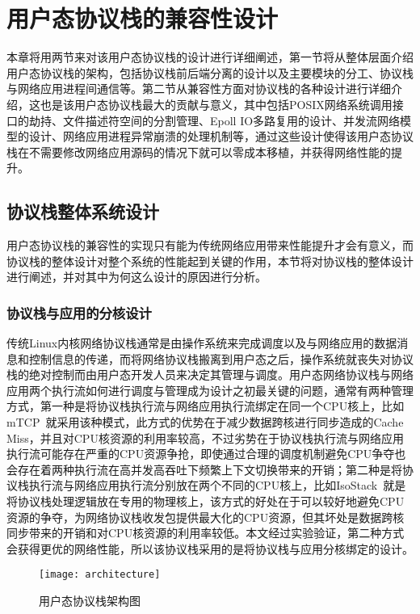 \chapter{用户态协议栈的兼容性设计}

本章将用两节来对该用户态协议栈的设计进行详细阐述，第一节将从整体层面介绍用户态协议栈的架构，包括协议栈前后端分离的设计以及主要模块的分工、协议栈与网络应用进程间通信等。第二节从兼容性方面对协议栈的各种设计进行详细介绍，这也是该用户态协议栈最大的贡献与意义，其中包括POSIX网络系统调用接口的劫持、文件描述符空间的分割管理、Epoll IO多路复用的设计、并发流网络模型的设计、网络应用进程异常崩溃的处理机制等，通过这些设计使得该用户态协议栈在不需要修改网络应用源码的情况下就可以零成本移植，并获得网络性能的提升。

\section{协议栈整体系统设计}

用户态协议栈的兼容性的实现只有能为传统网络应用带来性能提升才会有意义，而协议栈的整体设计对整个系统的性能起到关键的作用，本节将对协议栈的整体设计进行阐述，并对其中为何这么设计的原因进行分析。

\subsection{协议栈与应用的分核设计}

传统Linux内核网络协议栈通常是由操作系统来完成调度以及与网络应用的数据消息和控制信息的传递，而将网络协议栈搬离到用户态之后，操作系统就丧失对协议栈的绝对控制而由用户态开发人员来决定其管理与调度。用户态网络协议栈与网络应用两个执行流如何进行调度与管理成为设计之初最关键的问题，通常有两种管理方式，第一种是将协议栈执行流与网络应用执行流绑定在同一个CPU核上，比如mTCP~\cite{mTCP}就采用该种模式，此方式的优势在于减少数据跨核进行同步造成的Cache Miss，并且对CPU核资源的利用率较高，不过劣势在于协议栈执行流与网络应用执行流可能存在严重的CPU资源争抢，即使通过合理的调度机制避免CPU争夺也会存在着两种执行流在高并发高吞吐下频繁上下文切换带来的开销；第二种是将协议栈执行流与网络应用执行流分别放在两个不同的CPU核上，比如IsoStack~\cite{IsoStack}就是将协议栈处理逻辑放在专用的物理核上，该方式的好处在于可以较好地避免CPU资源的争夺，为网络协议栈收发包提供最大化的CPU资源，但其坏处是数据跨核同步带来的开销和对CPU核资源的利用率较低。本文经过实验验证，第二种方式会获得更优的网络性能，所以该协议栈采用的是将协议栈与应用分核绑定的设计。

\vspace{-10pt}
\begin{figure}[H] %
  \centering
  \texttt{[image: architecture]}
  \caption{用户态协议栈架构图}
  \label{fig:architecture}
\end{figure}
\vspace{-10pt}

